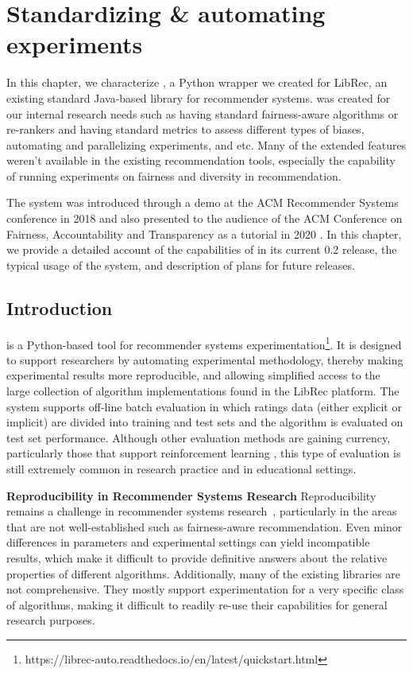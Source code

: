 
\chapter{Standardizing & automating experiments}
\label{librec-auto}

In this chapter, we characterize \librecato{}, a Python wrapper we created for LibRec, an existing standard Java-based library for recommender systems. \librecato{} was created for our internal research needs such as having standard fairness-aware algorithms or re-rankers and having standard metrics to assess different types of biases, automating and parallelizing experiments, and etc. Many of the extended features weren't available in the existing recommendation tools, especially the capability of running experiments on fairness and diversity in recommendation.

The system was introduced through a demo at the ACM Recommender Systems conference in 2018 \cite{mansoury2018automating} and also presented to the audience of the ACM Conference on Fairness, Accountability and Transparency as a tutorial in 2020 \cite{Sonboli2020FARLA}. In this chapter, we provide a detailed account of the capabilities of \libauto{} in its current 0.2 release, the typical usage of the system, and description of plans for future releases.

\section{Introduction}

\libauto{} is a Python-based tool for recommender systems experimentation\footnote{https://librec-auto.readthedocs.io/en/latest/quickstart.html}. It is designed to support researchers by automating experimental methodology, thereby making experimental results more reproducible, and allowing simplified access to the large collection of algorithm implementations found in the LibRec platform. The system supports off-line batch evaluation in which ratings data (either explicit or implicit) are divided into training and test sets and the algorithm is evaluated on test set performance. Although other evaluation methods are gaining currency, particularly those that support reinforcement learning \cite{joachims2018reveal,joachims2019reveal,joachims2020reveal}, this type of evaluation is still extremely common in research practice and in educational settings. 

\textbf{Reproducibility in Recommender Systems Research}
Reproducibility remains a challenge in recommender systems research~\cite{said2014comparative,beel2016towards,sun2020we}, particularly in the areas that are not well-established such as fairness-aware recommendation.
Even minor differences in parameters and experimental settings can yield incompatible results, which make it difficult to provide definitive answers about the relative properties of different algorithms. Additionally, many of the existing libraries are not comprehensive. They mostly support experimentation for a very specific class of algorithms, making it difficult to readily re-use their capabilities for general research purposes. 

